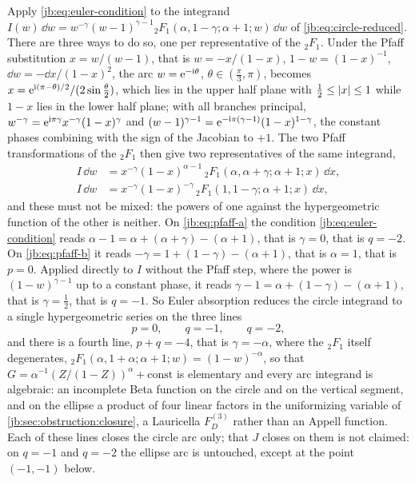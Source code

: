 Apply \eqref{jb:eq:euler-condition} to the integrand
$I(w) \, \dd w = w^{-\gamma} (w - 1)^{\gamma - 1} {}_2F_1(\alpha, 1 - \gamma; \alpha + 1; w) \, \dd w$
of \eqref{jb:eq:circle-reduced}.
There are three ways to do so, one per representative of the ${}_2F_1$.
Under the Pfaff substitution $x = w / (w - 1)$, that is $w = - x / (1 - x)$, $1 - w = (1 - x)^{-1}$,
$\dd w = - \dd x / (1 - x)^2$, the arc $w = \mathrm{e}^{-\mathrm{i}\theta}$, $\theta \in (\tfrac{\pi}{3}, \pi)$,
becomes $x = \mathrm{e}^{\mathrm{i} (\pi - \theta)/2} / (2 \sin \tfrac{\theta}{2})$, which lies in the upper half
plane with $\tfrac12 \le {|x|} \le 1$ while $1 - x$ lies in the lower half plane; with all
branches principal, $w^{-\gamma} = \mathrm{e}^{\mathrm{i} \pi \gamma} x^{-\gamma} (1 - x)^{\gamma}$ and
$(w - 1)^{\gamma - 1} = \mathrm{e}^{-\mathrm{i} \pi (\gamma - 1)} (1 - x)^{1 - \gamma}$, the constant phases
combining with the sign of the Jacobian to $+1$.
The two Pfaff transformations of the ${}_2F_1$ then give two representatives of the same
integrand,
\begin{subequations}
  \label{jb:eq:pfaff}
\begin{align}
  \label{jb:eq:pfaff-a}
  I \, \dd w
    &
    = x^{-\gamma} (1 - x)^{\alpha - 1} \,
      {}_2F_1(\alpha, \alpha + \gamma; \alpha + 1; x) \, \dd x,
  \\
  \label{jb:eq:pfaff-b}
  I \, \dd w
    &
    = x^{-\gamma} (1 - x)^{-\gamma} \,
      {}_2F_1(1, 1 - \gamma; \alpha + 1; x) \, \dd x,
\end{align}
\end{subequations}
and these must not be mixed: the powers of one against the hypergeometric function of the other
is neither.
On \eqref{jb:eq:pfaff-a} the condition \eqref{jb:eq:euler-condition} reads
$\alpha - 1 = \alpha + (\alpha + \gamma) - (\alpha + 1)$, that is $\gamma = 0$, that is $q = -2$.
On \eqref{jb:eq:pfaff-b} it reads $-\gamma = 1 + (1 - \gamma) - (\alpha + 1)$, that is $\alpha = 1$,
that is $p = 0$.
Applied directly to $I$ without the Pfaff step, where the power is $(1 - w)^{\gamma - 1}$ up to a
constant phase, it reads $\gamma - 1 = \alpha + (1 - \gamma) - (\alpha + 1)$, that is
$\gamma = \tfrac12$, that is $q = -1$.
So Euler absorption reduces the circle integrand to a single hypergeometric series on the three
lines
\begin{equation}
  \label{jb:eq:circle-lines}
  p
    = 0,
  \qquad
  q
    = -1,
  \qquad
  q
    = -2,
\end{equation}
and there is a fourth line, $p + q = -4$, that is $\gamma = - \alpha$, where the ${}_2F_1$ itself
degenerates, ${}_2F_1(\alpha, 1 + \alpha; \alpha + 1; w) = (1 - w)^{-\alpha}$, so that
$G = \alpha^{-1} (Z / (1 - Z))^{\alpha} + \text{const}$ is elementary and every arc integrand is
algebraic: an incomplete Beta function on the circle and on the vertical segment, and on the
ellipse a product of four linear factors in the uniformizing variable of
\cref{jb:sec:obstruction:closure}, a Lauricella $F_D^{(3)}$ rather than an Appell function.
Each of these lines closes the circle arc only; that $J$ closes on them is not claimed: on
$q = -1$ and $q = -2$ the ellipse arc is untouched, except at the point $(-1, -1)$ below.


